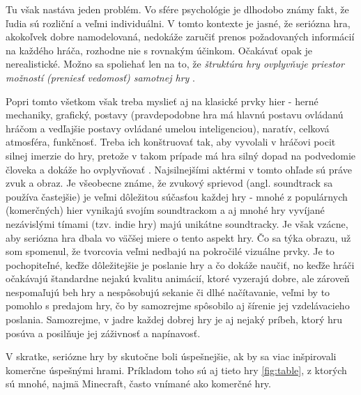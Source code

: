 \documentclass[10pt,twoside,slovak,a4paper]{article}
\begin{document}
Tu však nastáva jeden problém. Vo sfére psychológie je dlhodobo známy fakt, že ľudia sú rozliční a veľmi individuálni. V tomto kontexte je jasné, že seriózna hra, akokoľvek dobre namodelovaná, nedokáže zaručiť prenos požadovaných informácií na každého hráča, rozhodne nie s rovnakým účinkom. Očakávať opak je nerealistické. Možno sa spoliehať len na to, že \emph{štruktúra hry ovplyvňuje priestor možností (preniesť vedomosť) samotnej hry} \cite{mitgutsch2012purposeful}.

Popri tomto všetkom však treba myslieť aj na klasické prvky hier - herné mechaniky, grafický, postavy (pravdepodobne hra má hlavnú postavu ovládanú hráčom a vedľajšie postavy ovládané umelou inteligenciou), naratív, celková atmosféra, funkčnosť. Treba ich konštruovať tak, aby vyvolali v hráčovi pocit silnej imerzie do hry, pretože v takom prípade má hra silný dopad na podvedomie človeka a dokáže ho ovplyvňovať \cite{an2015subconscious}. Najsilnejšími aktérmi v tomto ohľade sú práve zvuk a obraz. Je všeobecne známe, že zvukový sprievod (angl. soundtrack sa používa častejšie) je veľmi dôležitou súčasťou každej hry - mnohé z populárnych (komerčných) hier vynikajú svojím soundtrackom a aj mnohé hry vyvíjané nezávislými tímami (tzv. indie hry) majú unikátne soundtracky. Je však vzácne, aby seriózna hra dbala vo väčšej miere o tento aspekt hry. Čo sa týka obrazu, už som spomenul, že tvorcovia veľmi nedbajú na pokročilé vizuálne prvky. Je to pochopiteľné, keďže dôležitejšie je poslanie hry a čo dokáže naučiť, no keďže hráči očakávajú štandardne nejakú kvalitu animácií, ktoré vyzerajú dobre, ale zároveň nespomaľujú beh hry a nespôsobujú sekanie či dlhé načítavanie, veľmi by to pomohlo s predajom hry, čo by samozrejme spôsobilo aj šírenie jej vzdelávacieho poslania. Samozrejme, v jadre každej dobrej hry je aj nejaký príbeh, ktorý hru posúva a posilňuje jej záživnosť a napínavosť.

V skratke, seriózne hry by skutočne boli úspešnejšie, ak by sa viac inšpirovali komerčne úspešnými hrami. Príkladom toho sú aj tieto hry \ref{fig:table}, z ktorých sú mnohé, najmä Minecraft, často vnímané ako komerčné hry.
\end{document}
